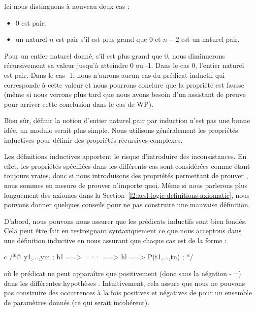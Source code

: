 

Ici nous distinguons à nouveau deux cas :

\begin{itemize}
\item 0 est pair,
\item un naturel $n$ est pair s'il est plus grand que $0$ et $n-2$ est un
      naturel pair.
\end{itemize}


Pour un entier naturel donné, s'il est plus grand que 0, nous diminuerons
récursivement sa valeur jusqu'à atteindre 0 ou -1. Dans le cas 0, l'entier
naturel est pair. Dans le cas -1, nous n'aurons aucun cas du prédicat inductif
qui corresponde
à cette valeur et nous pourrons conclure que la propriété est fausse (même si
nous verrons plus tard que nous avons besoin d'un assistant de preuve pour
arriver cette conclusion dans le cas de WP).





Bien sûr, définir la notion d'entier naturel pair par induction n'est pas une
bonne idée, un modulo serait plus simple. Nous utilisons généralement les
propriétés inductives pour définir des propriétés récursives complexes.




Les définitions inductives apportent le risque d'introduire des inconsistances.
En effet, les propriétés spécifiées dans les différents cas sont considérées
comme étant toujours vraies, donc si nous introduisons des propriétés permettant
de prouver , nous sommes en mesure de prouver n'importe quoi.
Même si nous parlerons plus longuement des axiomes dans la
Section~\ref{l2:acsl-logic-definitions-axiomatic}, nous pouvons donner quelques
conseils pour ne pas construire une mauvaise définition.


D'abord, nous pouvons nous assurer que les prédicats inductifs sont bien fondés.
Cela peut être fait en restreignant syntaxiquement ce que nous acceptons dans
une définition inductive en nous assurant que chaque cas est de la forme :
\begin{CodeBlock}{c}
/*@
  \forall y1,...,ym ; h1 ==> ··· ==> hl ==> P(t1,...,tn) ;
*/
\end{CodeBlock}
où le prédicat  ne peut apparaître que positivement (donc sans la
négation \CodeInline{!} - $\neg$) dans les différentes hypothèses .
Intuitivement, cela assure que nous ne pouvons pas construire des occurrences à la
fois positives et négatives de  pour un ensemble de paramètres donnés
(ce qui serait incohérent).




